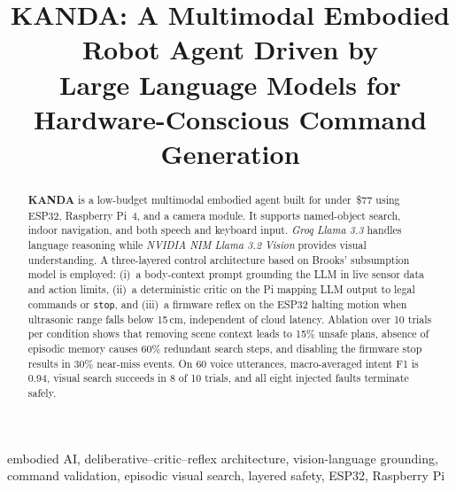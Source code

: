 \documentclass[conference]{IEEEtran}
\newcommand{\safe}{\texttt{stop}}
\newcommand{\groq}{\textit{Groq Llama 3.3}}
\newcommand{\nvidia}{\textit{NVIDIA NIM Llama 3.2 Vision}}
\begin{document}
\title{KANDA: A Multimodal Embodied Robot Agent Driven by\\Large Language Models for Hardware-Conscious Command Generation}

\author{%
\and
{}
}

\maketitle

\begin{abstract}
\textbf{KANDA} is a low-budget multimodal embodied agent built for under~\$77 using ESP32, Raspberry Pi~4, and a camera module.
It supports named-object search, indoor navigation, and both speech and keyboard input.
\groq{} handles language reasoning while \nvidia{} provides visual understanding.
A three-layered control architecture based on Brooks' subsumption model is employed: (i)~a body-context prompt grounding the LLM in live sensor data and action limits, (ii)~a deterministic critic on the Pi mapping LLM output to legal commands or \safe{}, and (iii)~a firmware reflex on the ESP32 halting motion when ultrasonic range falls below 15\,cm, independent of cloud latency.
Ablation over 10 trials per condition shows that removing scene context leads to 15\% unsafe plans, absence of episodic memory causes 60\% redundant search steps, and disabling the firmware stop results in 30\% near-miss events.
On 60 voice utterances, macro-averaged intent F1 is 0.94, visual search succeeds in 8 of 10 trials, and all eight injected faults terminate safely.
\end{abstract}

\begin{IEEEkeywords}
embodied AI, deliberative--critic--reflex architecture, vision-language grounding, command validation, episodic visual search, layered safety, ESP32, Raspberry Pi
\end{IEEEkeywords}
\end{document}
